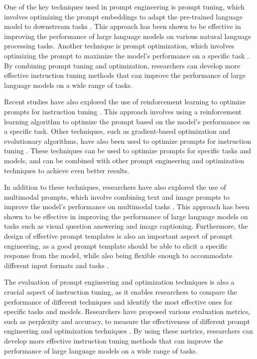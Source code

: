 \documentclass[11pt]{article}
\begin{document}
One of the key techniques used in prompt engineering is prompt tuning, which involves optimizing the prompt embeddings to adapt the pre-trained language model to downstream tasks \cite{ref62}. This approach has been shown to be effective in improving the performance of large language models on various natural language processing tasks. Another technique is prompt optimization, which involves optimizing the prompt to maximize the model's performance on a specific task \cite{ref63}. By combining prompt tuning and optimization, researchers can develop more effective instruction tuning methods that can improve the performance of large language models on a wide range of tasks.

Recent studies have also explored the use of reinforcement learning to optimize prompts for instruction tuning \cite{ref64}. This approach involves using a reinforcement learning algorithm to optimize the prompt based on the model's performance on a specific task. Other techniques, such as gradient-based optimization and evolutionary algorithms, have also been used to optimize prompts for instruction tuning \cite{ref65}. These techniques can be used to optimize prompts for specific tasks and models, and can be combined with other prompt engineering and optimization techniques to achieve even better results.

In addition to these techniques, researchers have also explored the use of multimodal prompts, which involve combining text and image prompts to improve the model's performance on multimodal tasks \cite{ref66}. This approach has been shown to be effective in improving the performance of large language models on tasks such as visual question answering and image captioning. Furthermore, the design of effective prompt templates is also an important aspect of prompt engineering, as a good prompt template should be able to elicit a specific response from the model, while also being flexible enough to accommodate different input formats and tasks \cite{ref67}.

The evaluation of prompt engineering and optimization techniques is also a crucial aspect of instruction tuning, as it enables researchers to compare the performance of different techniques and identify the most effective ones for specific tasks and models. Researchers have proposed various evaluation metrics, such as perplexity and accuracy, to measure the effectiveness of different prompt engineering and optimization techniques \cite{ref21}. By using these metrics, researchers can develop more effective instruction tuning methods that can improve the performance of large language models on a wide range of tasks.
\end{document}
